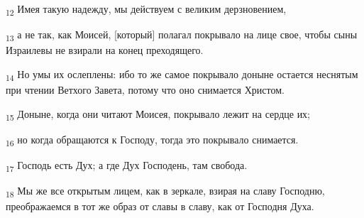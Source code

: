 \begin{tcolorbox}
\textsubscript{12} Имея такую надежду, мы действуем с великим дерзновением,
\end{tcolorbox}
\begin{tcolorbox}
\textsubscript{13} а не так, как Моисей, [который] полагал покрывало на лице свое, чтобы сыны Израилевы не взирали на конец преходящего.
\end{tcolorbox}
\begin{tcolorbox}
\textsubscript{14} Но умы их ослеплены: ибо то же самое покрывало доныне остается неснятым при чтении Ветхого Завета, потому что оно снимается Христом.
\end{tcolorbox}
\begin{tcolorbox}
\textsubscript{15} Доныне, когда они читают Моисея, покрывало лежит на сердце их;
\end{tcolorbox}
\begin{tcolorbox}
\textsubscript{16} но когда обращаются к Господу, тогда это покрывало снимается.
\end{tcolorbox}
\begin{tcolorbox}
\textsubscript{17} Господь есть Дух; а где Дух Господень, там свобода.
\end{tcolorbox}
\begin{tcolorbox}
\textsubscript{18} Мы же все открытым лицем, как в зеркале, взирая на славу Господню, преображаемся в тот же образ от славы в славу, как от Господня Духа.
\end{tcolorbox}
